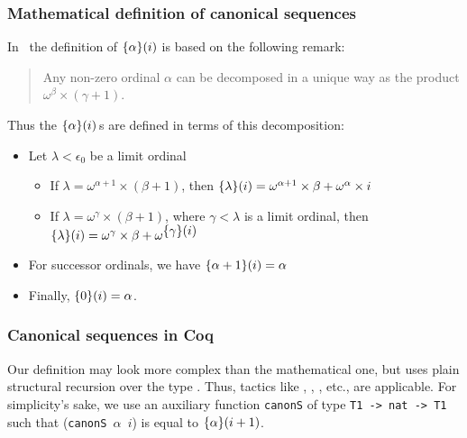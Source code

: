 \documentclass[a4paper]{book}
\begin{document}
\subsubsection{Mathematical definition of canonical sequences} 

In~\cite{KS81} the definition of $\mbox{$\{\alpha\}(i)$}$ is based on the following remark:
\begin{quote}
Any non-zero ordinal $\alpha$ can be decomposed in a unique way as the product
$\omega^\beta\times (\gamma+1)$.
\end{quote}

Thus the $\mbox{$\{\alpha\}(i)$}$\,s are defined in terms of this decomposition:
\begin{definition}
\label{def:canonseq-math}
  
\end{definition}
\begin{mathframe}
  \begin{itemize}
\item Let $\lambda<\epsilon_0$ be a limit ordinal 

\begin{itemize}
\item If $\lambda=\omega^{\alpha+1}\times (\beta+1)$, then 
$\mbox{$\{\lambda\}(i)$}= \omega^{\alpha+1}\times\beta +  \omega^\alpha \times i$
\item If $\lambda=\omega^{\gamma}\times (\beta+1)$, where $\gamma<\lambda$ is a limit ordinal, then 
$\mbox{$\{\lambda\}(i)$}=\omega^{\gamma}\times \beta + \omega^{\mbox{$\{\gamma\}(i)$}}$
\end{itemize}

\item For successor ordinals, we have $\mbox{$\{\alpha+1\}(i)$}= \alpha$ 

\item Finally, $\mbox{$\{0\}(i)$}= \alpha$.
\end{itemize}
\end{mathframe}

\subsubsection{Canonical sequences in Coq}

Our definition may look more complex than the mathematical one, but
uses plain structural recursion over the type . Thus, tactics like
, , , etc., are applicable. For simplicity's sake, 
we use an auxiliary function \texttt{canonS} of type \texttt{T1 -> nat  -> T1} such that
(\texttt{canonS  $\alpha$ $i$}) is equal to $\mbox{$\{\alpha\}(i+1)$}$.
\end{document}
